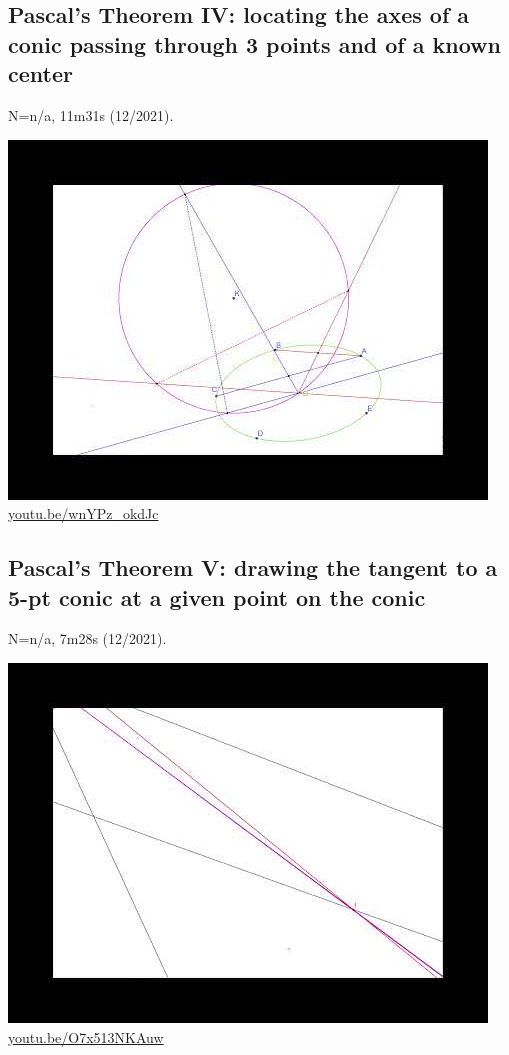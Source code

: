 \documentclass[12pt]{amsart}
\begin{document}
\subsection{Pascal's Theorem IV: locating the axes of a conic passing through 3 points and of a known center}
\label{vid:wnYPz_okdJc}
\noindent N=n/a, 11m31s (12/2021). 
\begin{center}\includegraphics[width=.5\textwidth]{pics/wnYPz_okdJc.jpg} \\ 
\href{https://youtu.be/wnYPz_okdJc}{\url{youtu.be/wnYPz\_okdJc}}\end{center}
% 

\subsection{Pascal's Theorem V: drawing the tangent to a 5-pt conic at a given point on the conic}
\label{vid:O7x513NKAuw}
\noindent N=n/a, 7m28s (12/2021). 
\begin{center}\includegraphics[width=.5\textwidth]{pics/O7x513NKAuw.jpg} \\ 
\href{https://youtu.be/O7x513NKAuw}{\url{youtu.be/O7x513NKAuw}}\end{center}
% 
\end{document}
